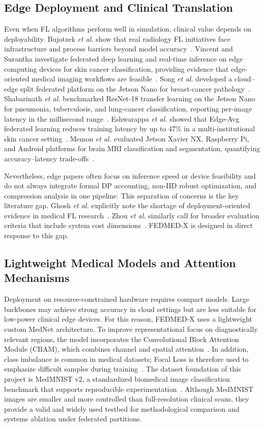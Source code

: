 \subsection{Edge Deployment and Clinical Translation}
Even when FL algorithms perform well in simulation, clinical value depends on
deployability. Bujotzek \emph{et al.} show that real radiology FL initiatives
face infrastructure and process barriers beyond model
accuracy~\cite{bujotzek2024real}. Vincent and Surantha investigate federated
deep learning and real-time inference on edge computing devices for skin
cancer classification, providing evidence that edge-oriented medical imaging
workflows are feasible~\cite{vincent2026federated}. Song \emph{et al.}
developed a cloud--edge split federated platform on the Jetson Nano for
breast-cancer pathology~\cite{song2025edgecloud}. Shabarinath \emph{et al.}
benchmarked ResNet-18 transfer learning on the Jetson Nano for pneumonia,
tuberculosis, and lung-cancer classification, reporting per-image latency in
the millisecond range~\cite{shabarinath2025efficacy}. Eshwarappa \emph{et
al.} showed that Edge-Avg federated learning reduces training latency by up
to 47\% in a multi-institutional skin cancer
setting~\cite{eshwarappa2025communication}. Memon \emph{et al.} evaluated
Jetson Xavier NX, Raspberry Pi, and Android platforms for brain MRI
classification and segmentation, quantifying accuracy--latency
trade-offs~\cite{memon2024edge}.

Nevertheless, edge papers often focus on inference speed or device
feasibility and do not always integrate formal DP accounting, non-IID robust
optimization, and compression analysis in one pipeline. This separation of
concerns is the key literature gap. Ghosh \emph{et al.} explicitly note the
shortage of deployment-oriented evidence in medical FL
research~\cite{ghosh2026advancements}. Zhou \emph{et al.} similarly call for
broader evaluation criteria that include system cost
dimensions~\cite{zhou2025federated}. FEDMED-X is designed in direct response
to this gap.

\subsection{Lightweight Medical Models and Attention Mechanisms}
Deployment on resource-constrained hardware requires compact models. Large
backbones may achieve strong accuracy in cloud settings but are less suitable
for low-power clinical edge devices. For this reason, FEDMED-X uses a
lightweight custom MedNet architecture. To improve representational focus on
diagnostically relevant regions, the model incorporates the Convolutional
Block Attention Module (CBAM), which combines channel and spatial
attention~\cite{woo2018cbam}. In addition, class imbalance is common in
medical datasets; Focal Loss is therefore used to emphasize difficult
samples during training~\cite{lin2017focal}. The dataset foundation of this
project is MedMNIST v2, a standardized biomedical image classification
benchmark that supports reproducible experimentation~\cite{yang2023medmnist}.
Although MedMNIST images are smaller and more controlled than full-resolution
clinical scans, they provide a valid and widely used testbed for
methodological comparison and systems ablation under federated partitions.

